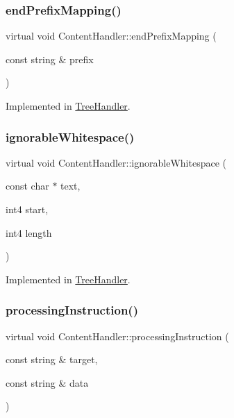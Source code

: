 \subsubsection{\texorpdfstring{endPrefixMapping()}{endPrefixMapping()}}
{\footnotesize\ttfamily virtual void Content\+Handler\+::end\+Prefix\+Mapping (\begin{DoxyParamCaption}\item[{const string \&}]{prefix }\end{DoxyParamCaption})\hspace{0.3cm}{\ttfamily [pure virtual]}}



Implemented in \mbox{\hyperlink{class_tree_handler_ac4634964bc8b641168519c844cafaaf6}{Tree\+Handler}}.

\mbox{\label{class_content_handler_a3158c975bb26ff02b941954cb4764da9}} 
\subsubsection{\texorpdfstring{ignorableWhitespace()}{ignorableWhitespace()}}
{\footnotesize\ttfamily virtual void Content\+Handler\+::ignorable\+Whitespace (\begin{DoxyParamCaption}\item[{const char $\ast$}]{text,  }\item[{int4}]{start,  }\item[{int4}]{length }\end{DoxyParamCaption})\hspace{0.3cm}{\ttfamily [pure virtual]}}



Implemented in \mbox{\hyperlink{class_tree_handler_a9364537779e9dd81b59f3572343d3207}{Tree\+Handler}}.

\mbox{\label{class_content_handler_a6b3929cb92630d4535b63f6470ff3020}} 
\subsubsection{\texorpdfstring{processingInstruction()}{processingInstruction()}}
{\footnotesize\ttfamily virtual void Content\+Handler\+::processing\+Instruction (\begin{DoxyParamCaption}\item[{const string \&}]{target,  }\item[{const string \&}]{data }\end{DoxyParamCaption})\hspace{0.3cm}{\ttfamily [pure virtual]}}



